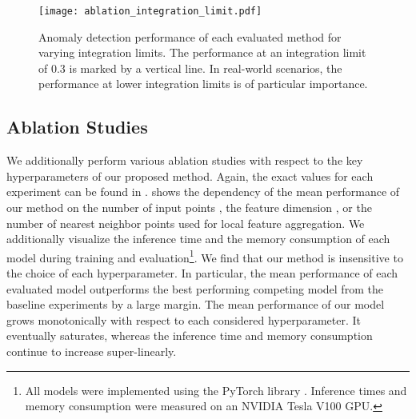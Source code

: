 \documentclass[twoside,11pt]{article}
\begin{document}
\begin{figure}[ht]
    \centering
    \texttt{[image: ablation\_integration\_limit.pdf]}
    \caption{Anomaly detection performance of each evaluated method for varying integration limits. The performance at an integration limit of 0.3 is marked by a vertical line. In real-world scenarios, the performance at lower integration limits is of particular importance.}
    \label{fig:ablation_integration_limit}
\end{figure}

\subsection{Ablation Studies}

We additionally perform various ablation studies with respect to the key hyperparameters of our proposed method. Again, the exact values for each experiment can be found in .  shows the dependency of the mean performance of our method on the number of input points , the feature dimension , or the number of nearest neighbor points  used for local feature aggregation. We additionally visualize the inference time and the memory consumption of each model during training and evaluation\footnote{All models were implemented using the PyTorch library \citep{Paszke_2019_PyTorch}. Inference times and memory consumption were measured on an NVIDIA Tesla V100 GPU.}. We find that our method is insensitive to the choice of each hyperparameter. In particular, the mean performance of each evaluated model outperforms the best performing competing model from the baseline experiments by a large margin. The mean performance of our model grows monotonically with respect to each considered hyperparameter. It eventually saturates, whereas the inference time and memory consumption continue to increase super-linearly.
\end{document}
